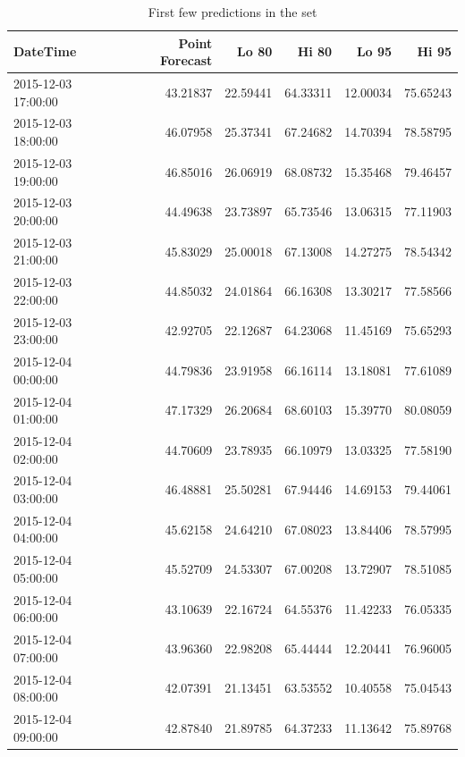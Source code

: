 \documentclass[openany]{book}
\begin{document}
\begin{table}[H]

\caption{\label{tab:unnamed-chunk-38}First few predictions in the set}
\centering
\begin{tabular}{l|r|r|r|r|r}
\hline
DateTime & Point Forecast & Lo 80 & Hi 80 & Lo 95 & Hi 95\\
\hline
\rowcolor{gray!6}  2015-12-03 17:00:00 & 43.21837 & 22.59441 & 64.33311 & 12.00034 & 75.65243\\
\hline
2015-12-03 18:00:00 & 46.07958 & 25.37341 & 67.24682 & 14.70394 & 78.58795\\
\hline
\rowcolor{gray!6}  2015-12-03 19:00:00 & 46.85016 & 26.06919 & 68.08732 & 15.35468 & 79.46457\\
\hline
2015-12-03 20:00:00 & 44.49638 & 23.73897 & 65.73546 & 13.06315 & 77.11903\\
\hline
\rowcolor{gray!6}  2015-12-03 21:00:00 & 45.83029 & 25.00018 & 67.13008 & 14.27275 & 78.54342\\
\hline
2015-12-03 22:00:00 & 44.85032 & 24.01864 & 66.16308 & 13.30217 & 77.58566\\
\hline
\rowcolor{gray!6}  2015-12-03 23:00:00 & 42.92705 & 22.12687 & 64.23068 & 11.45169 & 75.65293\\
\hline
2015-12-04 00:00:00 & 44.79836 & 23.91958 & 66.16114 & 13.18081 & 77.61089\\
\hline
\rowcolor{gray!6}  2015-12-04 01:00:00 & 47.17329 & 26.20684 & 68.60103 & 15.39770 & 80.08059\\
\hline
2015-12-04 02:00:00 & 44.70609 & 23.78935 & 66.10979 & 13.03325 & 77.58190\\
\hline
\rowcolor{gray!6}  2015-12-04 03:00:00 & 46.48881 & 25.50281 & 67.94446 & 14.69153 & 79.44061\\
\hline
2015-12-04 04:00:00 & 45.62158 & 24.64210 & 67.08023 & 13.84406 & 78.57995\\
\hline
\rowcolor{gray!6}  2015-12-04 05:00:00 & 45.52709 & 24.53307 & 67.00208 & 13.72907 & 78.51085\\
\hline
2015-12-04 06:00:00 & 43.10639 & 22.16724 & 64.55376 & 11.42233 & 76.05335\\
\hline
\rowcolor{gray!6}  2015-12-04 07:00:00 & 43.96360 & 22.98208 & 65.44444 & 12.20441 & 76.96005\\
\hline
2015-12-04 08:00:00 & 42.07391 & 21.13451 & 63.53552 & 10.40558 & 75.04543\\
\hline
\rowcolor{gray!6}  2015-12-04 09:00:00 & 42.87840 & 21.89785 & 64.37233 & 11.13642 & 75.89768\\

\end{tabular}
\end{table}
\end{document}
